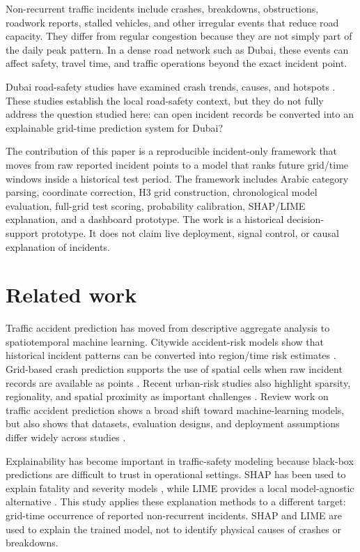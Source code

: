 \documentclass[conference]{IEEEtran}
\begin{document}
Non-recurrent traffic incidents include crashes, breakdowns, obstructions, roadwork reports, stalled vehicles, and other irregular events that reduce road capacity. They differ from regular congestion because they are not simply part of the daily peak pattern. In a dense road network such as Dubai, these events can affect safety, travel time, and traffic operations beyond the exact incident point.

Dubai road-safety studies have examined crash trends, causes, and hotspots \cite{aldah2010dubai,abdelfatah2015dubai,alsaleh2026dubaihotspots}. These studies establish the local road-safety context, but they do not fully address the question studied here: can open incident records be converted into an explainable grid-time prediction system for Dubai?

The contribution of this paper is a reproducible incident-only framework that moves from raw reported incident points to a model that ranks future grid/time windows inside a historical test period. The framework includes Arabic category parsing, coordinate correction, H3 grid construction, chronological model evaluation, full-grid test scoring, probability calibration, SHAP/LIME explanation, and a dashboard prototype. The work is a historical decision-support prototype. It does not claim live deployment, signal control, or causal explanation of incidents.

\section{Related work}

Traffic accident prediction has moved from descriptive aggregate analysis to spatiotemporal machine learning. Citywide accident-risk models show that historical incident patterns can be converted into region/time risk estimates \cite{ren2017citywide,zhou2020riskoracle}. Grid-based crash prediction supports the use of spatial cells when raw incident records are available as points \cite{kashifi2022grid}. Recent urban-risk studies also highlight sparsity, regionality, and spatial proximity as important challenges \cite{chen2024urbanrisk}. Review work on traffic accident prediction shows a broad shift toward machine-learning models, but also shows that datasets, evaluation designs, and deployment assumptions differ widely across studies \cite{behboudi2024review}.

Explainability has become important in traffic-safety modeling because black-box predictions are difficult to trust in operational settings. SHAP has been used to explain fatality and severity models \cite{rifat2024explainable,sufian2023severity}, while LIME provides a local model-agnostic alternative \cite{ribeiro2016lime}. This study applies these explanation methods to a different target: grid-time occurrence of reported non-recurrent incidents. SHAP and LIME are used to explain the trained model, not to identify physical causes of crashes or breakdowns.
\end{document}

